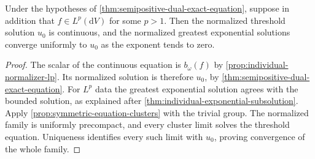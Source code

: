 \begin{corollary}\label{cor:semipositive-dual-lp-limit}
Under the hypotheses of \cref{thm:semipositive-dual-exact-equation}, suppose in addition that $f\in L^p(\mathrm{d}V)$ for some $p>1$. Then the normalized threshold solution $u_0$ is continuous, and the normalized greatest exponential solutions converge uniformly to $u_0$ as the exponent tends to zero.
\end{corollary}
\begin{proof}
The scalar of the continuous equation is $b_\omega(f)$ by \cref{prop:individual-normalizer-lp}. Its normalized solution is therefore $u_0$, by \cref{thm:semipositive-dual-exact-equation}. For $L^p$ data the greatest exponential solution agrees with the bounded solution, as explained after \cref{thm:individual-exponential-subsolution}. Apply \cref{prop:symmetric-equation-clusters} with the trivial group. The normalized family is uniformly precompact, and every cluster limit solves the threshold equation. Uniqueness identifies every such limit with $u_0$, proving convergence of the whole family.
\end{proof}
